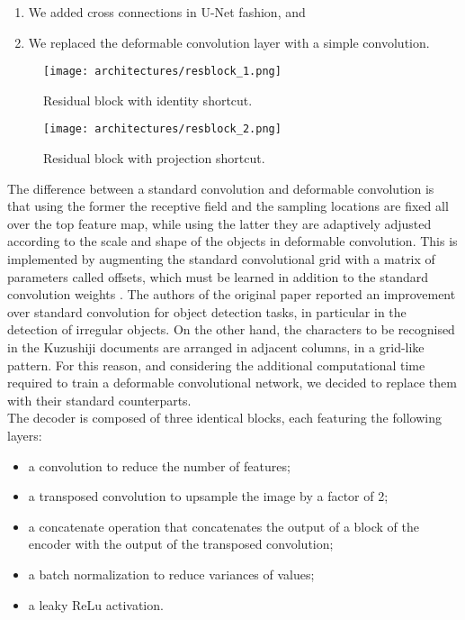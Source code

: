 \begin{enumerate}
	\item We added cross connections in U-Net fashion, and
	\item We replaced the deformable convolution layer with a simple convolution.
\end{enumerate}

\begin{figure}[h]
	\caption{Residual block with identity shortcut.}
	\centering
	\texttt{[image: architectures/resblock\_1.png]}
	\label{fig:resblock_1}
\end{figure}

\begin{figure}[h]
	\caption{Residual block with projection shortcut.}
	\centering
	\texttt{[image: architectures/resblock\_2.png]}
	\label{fig:resblock_2}
\end{figure}

The difference between a standard convolution and deformable convolution is that using the former the receptive field and the sampling locations are fixed all over the top feature map, while using the latter they are adaptively adjusted according to the scale and shape of the objects in deformable convolution. This is implemented by augmenting the standard convolutional grid with a matrix of parameters called offsets, which must be learned in addition to the standard convolution weights \cite{DeformableConv2017}. The authors of the original paper reported an improvement over standard convolution for object detection tasks, in particular in the detection of irregular objects. On the other hand, the characters to be recognised in the Kuzushiji documents are arranged in adjacent columns, in a grid-like pattern. For this reason, and considering the additional computational time required to train a deformable convolutional network, we decided to replace them with their standard counterparts. \\

The decoder is composed of three identical blocks, each featuring the following layers:

\begin{itemize}
	\item a convolution to reduce the number of features;
	\item a transposed convolution to upsample the image by a factor of 2;
	\item a concatenate operation that concatenates the output of a block of the encoder with the output of the transposed convolution;
	\item a batch normalization to reduce variances of values;
	\item a leaky ReLu activation.
\end{itemize}

